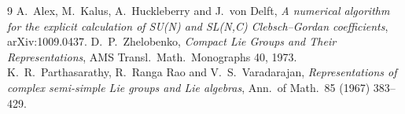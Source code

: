 \documentclass[11pt]{article}
\begin{document}
\begin{small}
\begin{thebibliography}{9}
 A.~Alex, M.~Kalus, A.~Huckleberry and J.~von Delft, \emph{A numerical algorithm for the explicit calculation of SU(N) and SL(N,C) Clebsch--Gordan coefficients}, arXiv:1009.0437.
 D.~P.~Zhelobenko, \emph{Compact Lie Groups and Their Representations}, AMS Transl.\ Math.\ Monographs 40, 1973.
 K.~R.~Parthasarathy, R.~Ranga Rao and V.~S.~Varadarajan, \emph{Representations of complex semi-simple Lie groups and Lie algebras}, Ann.\ of Math.\ 85 (1967) 383--429.
\end{thebibliography}
\end{small}
\end{document}
